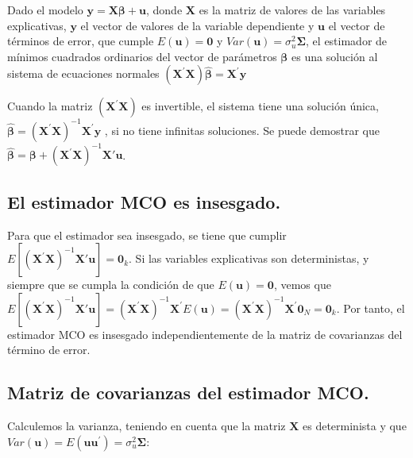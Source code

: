 Dado el modelo $\boldsymbol{y}=\boldsymbol{X}\boldsymbol{\beta}+\boldsymbol{u}$,
donde $\boldsymbol{X}$ es la matriz de valores de las variables explicativas,
$\boldsymbol{y}$ el vector de valores de la variable dependiente
y $\boldsymbol{u}$ el vector de t\'erminos de error, que cumple $E\left(\boldsymbol{u}\right)=\boldsymbol{0}$
y $Var\left(\boldsymbol{u}\right)=\sigma_{u}^{2}\boldsymbol{\Sigma}$,
el estimador de m\'inimos cuadrados ordinarios del vector de par\'ametros
$\boldsymbol{\beta}$ es una soluci\'on al sistema de ecuaciones normales
$\left(\boldsymbol{X}^{\prime}\boldsymbol{X}\right)\hat{\boldsymbol{\beta}}=\boldsymbol{X}^{\prime}\boldsymbol{y}$

Cuando la matriz $\left(\boldsymbol{X}^{\prime}\boldsymbol{X}\right)$
es invertible, el sistema tiene una soluci\'on \'unica,$\hat{\boldsymbol{\beta}}=\left(\boldsymbol{X}^{\prime}\boldsymbol{X}\right)^{-1}\boldsymbol{X}^{\prime}\boldsymbol{y}$
, si no tiene infinitas soluciones. Se puede demostrar que $\hat{\boldsymbol{\beta}}=\boldsymbol{\beta}+\left(\boldsymbol{X}^{\prime}\boldsymbol{X}\right)^{-1}\boldsymbol{X}'\boldsymbol{u}$.


\subsection{El estimador MCO es insesgado.}

Para que el estimador sea insesgado, se tiene que cumplir $E\left[\left(\boldsymbol{X}^{\prime}\boldsymbol{X}\right)^{-1}\boldsymbol{X}'\boldsymbol{u}\right]=\boldsymbol{0}_{k}$.
Si las variables explicativas son deterministas, y siempre que se
cumpla la condici\'on de que $E\left(\boldsymbol{u}\right)=\boldsymbol{0}$,
vemos que $E\left[\left(\boldsymbol{X}^{\prime}\boldsymbol{X}\right)^{-1}\boldsymbol{X}'\boldsymbol{u}\right]=\left(\boldsymbol{X}^{\prime}\boldsymbol{X}\right)^{-1}\boldsymbol{X}^{\prime}E\left(\boldsymbol{u}\right)=\left(\boldsymbol{X}^{\prime}\boldsymbol{X}\right)^{-1}\boldsymbol{X}^{\prime}\boldsymbol{0}_{N}=\boldsymbol{0}_{k}$.
Por tanto, el estimador MCO es insesgado independientemente de la
matriz de covarianzas del t\'ermino de error.


\subsection{Matriz de covarianzas del estimador MCO.}

Calculemos la varianza, teniendo en cuenta que la matriz $\boldsymbol{X}$
es determinista y que $Var\left(\boldsymbol{u}\right)=E\left(\boldsymbol{u}\boldsymbol{u}^{\prime}\right)=\sigma_{u}^{2}\boldsymbol{\Sigma}$:

